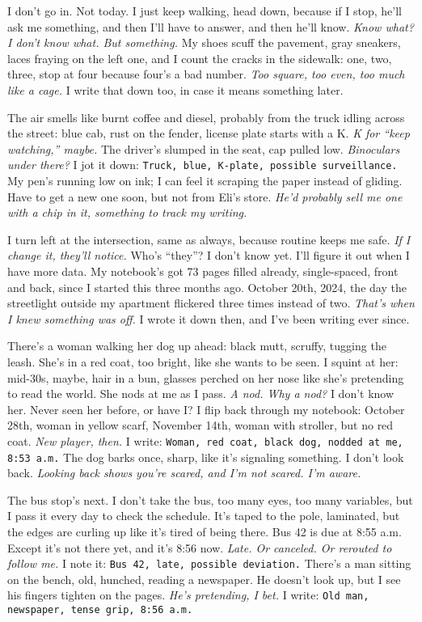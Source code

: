 \documentclass[12pt,oneside]{book} %
\newcommand{\note}[1]{\texttt{#1}}
\begin{document}
I don’t go in. Not today. I just keep walking, head down, because if I stop, he’ll ask me something, and then I’ll have to answer, and then he’ll know. \textit{Know what? I don’t know what. But something.} My shoes scuff the pavement, gray sneakers, laces fraying on the left one, and I count the cracks in the sidewalk: one, two, three, stop at four because four’s a bad number. \textit{Too square, too even, too much like a cage.} I write that down too, in case it means something later.

The air smells like burnt coffee and diesel, probably from the truck idling across the street: blue cab, rust on the fender, license plate starts with a K. \textit{K for “keep watching,” maybe.} The driver’s slumped in the seat, cap pulled low. \textit{Binoculars under there?} I jot it down: \note{Truck, blue, K-plate, possible surveillance.} My pen’s running low on ink; I can feel it scraping the paper instead of gliding. Have to get a new one soon, but not from \textnormal{Eli}’s store. \textit{He’d probably sell me one with a chip in it, something to track my writing.}

I turn left at the intersection, same as always, because routine keeps me safe. \textit{If I change it, they’ll notice.} Who’s “they”? I don’t know yet. I’ll figure it out when I have more data. My notebook’s got 73 pages filled already, single-spaced, front and back, since I started this three months ago. October 20th, 2024, the day the streetlight outside my apartment flickered three times instead of two. \textit{That’s when I knew something was off.} I wrote it down then, and I’ve been writing ever since.

There’s a woman walking her dog up ahead: black mutt, scruffy, tugging the leash. She’s in a red coat, too bright, like she wants to be seen. I squint at her: mid-30s, maybe, hair in a bun, glasses perched on her nose like she’s pretending to read the world. She nods at me as I pass. \textit{A nod. Why a nod?} I don’t know her. Never seen her before, or have I? I flip back through my notebook: October 28th, woman in yellow scarf, November 14th, woman with stroller, but no red coat. \textit{New player, then.} I write: \note{Woman, red coat, black dog, nodded at me, 8:53 a.m.} The dog barks once, sharp, like it’s signaling something. I don’t look back. \textit{Looking back shows you’re scared, and I’m not scared. I’m aware.}

The bus stop’s next. I don’t take the bus, too many eyes, too many variables, but I pass it every day to check the schedule. It’s taped to the pole, laminated, but the edges are curling up like it’s tired of being there. Bus 42 is due at 8:55 a.m. Except it’s not there yet, and it’s 8:56 now. \textit{Late. Or canceled. Or rerouted to follow me.} I note it: \note{Bus 42, late, possible deviation.} There’s a man sitting on the bench, old, hunched, reading a newspaper. He doesn’t look up, but I see his fingers tighten on the pages. \textit{He’s pretending, I bet.} I write: \note{Old man, newspaper, tense grip, 8:56 a.m.}
\end{document}
